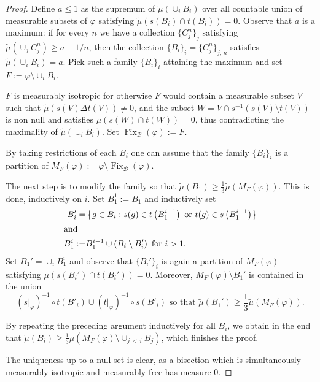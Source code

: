 \documentclass[AHL,Unicode,longabstracts,published]{cedram}
\newcommand{\rb}{\mathscr{B}}
\DeclareMathOperator{\Fix}{Fix}
\newcommand{\ph}{\varphi}
\begin{document}
\begin{proof}
Define $a \leq 1$ as the supremum of $\widetilde \mu(\cup_i B_i)$ over all countable union of measurable subsets of $\ph$ satisfying $\widetilde \mu(s(B_i) \cap t(B_i))=0$. Observe that $a$ is a maximum: if for every $n$ we have a collection $\{C_j^n\}_j$ satisfying $\widetilde \mu(\cup_j C_j^n) \geq a-1/n$, then the collection $\{B_i\}_i = \{C_j^n\}_{j,\,n}$ satisfies $\widetilde \mu(\cup_i B_i)=a$. Pick such a family $\{B_i\}_i$ attaining the maximum and set $F:=\ph \setminus \cup_i B_i$.

$F$ is measurably {isotropic} for otherwise $F$ would contain a measurable subset $V$ such that $\widetilde \mu(s(V)\Delta t(V))\not=0$, and the subset $W=V\cap s^{-1}(s(V) \setminus t(V))$ is non null and satisfies $\mu(s(W)\cap t(W))=0$, thus contradicting the maximality of $\widetilde \mu(\cup_i B_i)$. Set $\Fix_{\rb}(\ph):=F$.

By taking restrictions of each $B_i$ one can assume that the family $\{B_i\}_i$ is a partition of $M_F(\ph):=\ph\setminus \Fix_{\rb}(\ph)$.

The next step is to modify the family so that $\widetilde \mu(B_1) \geq \frac 1 3 \widetilde \mu(M_F(\ph))$. This is done, inductively on $i$. Set $B_1^1:=B_1$ and inductively set
\begin{align*}
B_i'=& \left\{g \in B_i : s(g) \in t\left(B_{1}^{i-1}\right) \text{ or }t(g) \in s\left(B_1^{i-1}\right)\right\}\\
\intertext{and}
B_1^i:=& B_1^{i-1}\cup\left(B_i\setminus B_i'\right)\text{ for }i>1.
\end{align*}
Set $B_1'=\cup_i B_1^i$ and observe that $\{B_i'\}_i$ is again a partition of $M_F(\ph)$ satisfying $\mu(s(B_i') \cap t(B_i'))=0$. Moreover, $M_F(\ph)\setminus B_1'$ is contained in the union
\[
\left(s\big|_\ph\right)^{-1}\circ t\left(B'_i\right) \cup \left(t\big|_\ph\right)^{-1}\circ s(B'_i)\text{ so that }\widetilde \mu\left(B_1'\right)\geq \frac 1 3 \widetilde \mu\left(M_F(\ph)\right).
\]

By repeating the preceding argument inductively for all $B_i$, we obtain in the end that $\widetilde \mu(B_i) \geq \frac 1 3 \widetilde \mu(M_F(\ph) \setminus \cup_{j\,<\,i} B_j)$, which finishes the proof.


The uniqueness up to a null set is clear, as a bisection which is simultaneously measurably isotropic and measurably free has measure $0$.
\end{proof}
\end{document}
